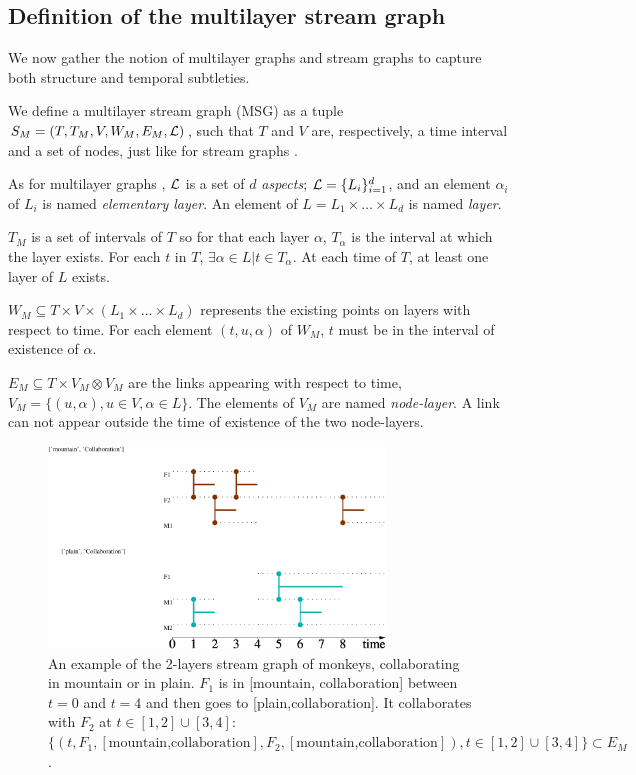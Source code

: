 \documentclass{svproc}
\begin{document}
\subsection{Definition of the multilayer stream graph}
%
We now gather the notion of multilayer graphs and stream graphs to capture both structure and temporal subtleties.

We define a multilayer stream graph (MSG) as a tuple $S_M = (T,T_M,V,W_M,E_M,{\cal L})$, such that $T$ and $V$ are, respectively, a time interval and a set of nodes, just like for stream graphs \cite{stream}.
    
    As for multilayer graphs \cite{mlkiv}, ${\cal L}$ is a set of $d$ {\em aspects}; ${\cal L} = \{L_i\}_{i=1}^d$, and an element $\alpha_i$ of $L_i$ is named {\em elementary layer}. An element of $L=L_1\times \dots \times L_d$ is named {\em layer}.

	$T_M$ is a set of intervals of $T$ so for that each layer $\alpha$, $T_{\alpha}$ is the interval at which the layer exists. For each $t$ in $T$, $\exists \alpha \in L | t \in T_{\alpha}$. At each time of $T$, at least one layer of $L$ exists.

	$W_M \subseteq T\times V \times (L_1 \times \dots \times L_d)$ represents the existing points on layers with respect to time. For each element $(t,u,\alpha)$ of $W_M$, $t$ must be in the interval of existence of $\alpha$.

   $E_M \subseteq T\times V_M \otimes V_M$ are the links appearing with respect to time,  $V_M = \{ (u,\alpha), u\in V, \alpha \in L\}$. The elements of $V_M$ are named {\em node-layer}. A link can not appear outside the time of existence of the two node-layers.
   
   \begin{figure}[h]
   	\includegraphics[width=0.8\textwidth]{img/monkeymls.pdf}
   	\caption{An example of the 2-layers stream graph of monkeys, collaborating in mountain or in plain. $F_1$ is in [mountain, collaboration] between $t=0$ and $t=4$ and then goes to [plain,collaboration]. It collaborates with $F_2$ at $t\in [1,2]\cup[3,4]$: $\{(t,F_1,[\text{mountain,collaboration}],F_2,[\text{mountain,collaboration}]),t\in [1,2]\cup[3,4]\} \subset E_M$.}
   \end{figure}
   
\end{document}
